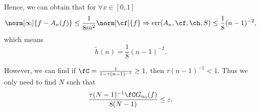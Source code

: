 Hence, we can obtain that for $\forall x \in [0,1]$
\begin{equation}\norm[\infty]{f-A_{n}(f)} \leq  \frac{1}{8m^{2}}\norm[\cf]{f} \Rightarrow \err(A_n,\cf,\ch,S) \leq \frac{1}{8}(n-1)^{-2},
\end{equation}
which means $$\tilde{h}(n)=\frac{1}{8}(n-1)^{-2}.$$


%
%
%
%
%

However, we can find if $\fC =\frac{1}{1 - \tau (n-1)^{-1}} \ge 1,$ then $\tau (n-1)^{-1} <1.$
Thus we only need to find $N$ such that  \[
\frac{\tau (N-1)^{-1}\fC G_{n_{0}}(f)}{8(N-1)} \le \varepsilon.
\]

